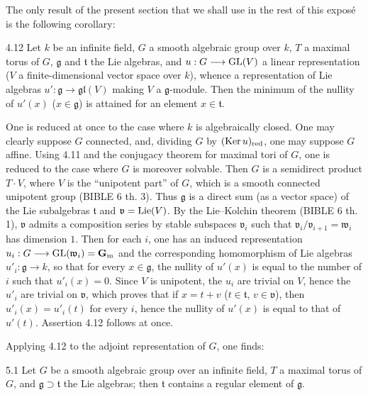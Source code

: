 The only result
of the present
section that we
shall use in the
rest of this
expos\'e is the
following corollary:
\begin{corollary}{4.12}\label{XIV.4.12}
Let $k$ be an
infinite field,
$G$ a smooth
algebraic group
over $k$, $T$
a maximal torus
of $G$,
$\mathfrak g$ and
$\mathfrak t$ the
Lie algebras,
and $u:G\longrightarrow\operatorname{GL}(V)$
a linear representation
($V$ a finite-dimensional
vector space over
$k$), whence a
representation of
Lie algebras
$u':\mathfrak g\to\mathfrak{gl}(V)$
making $V$ a
$\mathfrak g$-module.
Then the minimum
of the nullity
of $u'(x)$
($x\in\mathfrak g$)
is attained for
an element
$x\in\mathfrak t$.
\end{corollary}
One is reduced
at once to the
case where $k$
is algebraically
closed. One may
clearly suppose
$G$ connected,
and, dividing
$G$ by
$(\operatorname{Ker} u)_{\mathrm{red}}$,
one may suppose
$G$ affine.
Using 4.11 and
the conjugacy
theorem for
maximal tori of
$G$, one is
reduced to the
case where $G$
is moreover
solvable. Then
$G$ is a
semidirect product
$T\cdot V$,
where $V$ is
the ``unipotent
part'' of $G$,
which is a
smooth connected
unipotent group
(BIBLE 6 th. 3).
Thus $\mathfrak g$
is a direct sum
(as a vector
space) of the
Lie subalgebras
$\mathfrak t$ and
$\mathfrak v=\operatorname{Lie}(V)$.
By the Lie--Kolchin
theorem (BIBLE 6
th. 1),
$\mathfrak v$ admits
a composition
series by stable
subspaces
$\mathfrak v_i$
such that
$\mathfrak v_i/\mathfrak v_{i+1}=\mathfrak w_i$
has dimension $1$.
Then for each
$i$, one has
an induced
representation
$u_i:G\longrightarrow\operatorname{GL}(\mathfrak w_i)=\mathbf{G}_{\mathrm{m}}$
and the
corresponding
homomorphism of
Lie algebras
$u'_i:\mathfrak g\to k$,
so that for
every
$x\in\mathfrak g$,
the nullity of
$u'(x)$ is
equal to the
number of $i$
such that
$u'_i(x)=0$.
Since $V$ is
unipotent, the
$u_i$ are
trivial on $V$,
hence the
$u'_i$ are
trivial on
$\mathfrak v$,
which proves
that if $x=t+v$
($t\in\mathfrak t$,
$v\in\mathfrak v$),
then $u'_i(x)=u'_i(t)$
for every $i$,
hence the
nullity of
$u'(x)$ is
equal to that
of $u'(t)$.
Assertion 4.12
follows at once.

Applying 4.12
to the adjoint
representation of
$G$, one finds:
\begin{theorem}{5.1}\label{XIV.5.1}
Let $G$ be a
smooth algebraic
group over an
infinite field,
$T$ a maximal
torus of $G$,
and
$\mathfrak g\supset\mathfrak t$
the Lie
algebras; then
$\mathfrak t$
contains a
regular element
of $\mathfrak g$.
\end{theorem}


